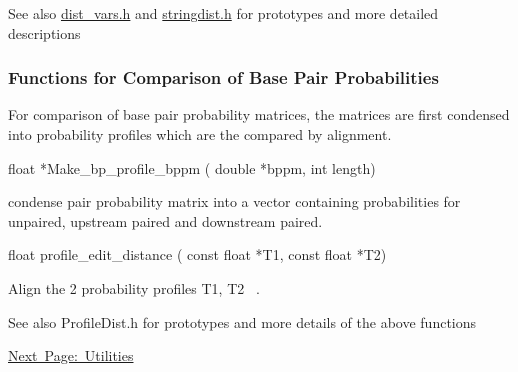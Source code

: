\begin{DoxySeeAlso}{See also}
\mbox{\hyperlink{dist__vars_8h}{dist\+\_\+vars.\+h}} and \mbox{\hyperlink{stringdist_8h}{stringdist.\+h}} for prototypes and more detailed descriptions
\end{DoxySeeAlso}
\subsubsection*{Functions for Comparison of Base Pair Probabilities}

For comparison of base pair probability matrices, the matrices are first condensed into probability profiles which are the compared by alignment.

\begin{DoxyVerb}float *Make_bp_profile_bppm ( double *bppm,
                              int length)
\end{DoxyVerb}
 condense pair probability matrix into a vector containing probabilities for unpaired, upstream paired and downstream paired.

\begin{DoxyVerb}float profile_edit_distance ( const float *T1,
                              const float *T2)
\end{DoxyVerb}
 Align the 2 probability profiles T1, T2~\newline
.

\begin{DoxySeeAlso}{See also}
Profile\+Dist.\+h for prototypes and more details of the above functions
\end{DoxySeeAlso}
\mbox{\hyperlink{mp_utils}{Next Page\+: Utilities}} 